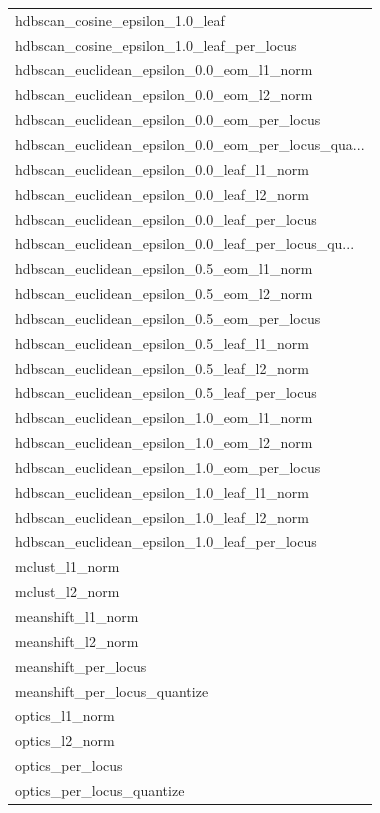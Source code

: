 \begin{longtable}{l}
                   hdbscan\_cosine\_epsilon\_1.0\_leaf \\
         hdbscan\_cosine\_epsilon\_1.0\_leaf\_per\_locus \\
         hdbscan\_euclidean\_epsilon\_0.0\_eom\_l1\_norm \\
         hdbscan\_euclidean\_epsilon\_0.0\_eom\_l2\_norm \\
       hdbscan\_euclidean\_epsilon\_0.0\_eom\_per\_locus \\
hdbscan\_euclidean\_epsilon\_0.0\_eom\_per\_locus\_qua... \\
        hdbscan\_euclidean\_epsilon\_0.0\_leaf\_l1\_norm \\
        hdbscan\_euclidean\_epsilon\_0.0\_leaf\_l2\_norm \\
      hdbscan\_euclidean\_epsilon\_0.0\_leaf\_per\_locus \\
hdbscan\_euclidean\_epsilon\_0.0\_leaf\_per\_locus\_qu... \\
         hdbscan\_euclidean\_epsilon\_0.5\_eom\_l1\_norm \\
         hdbscan\_euclidean\_epsilon\_0.5\_eom\_l2\_norm \\
       hdbscan\_euclidean\_epsilon\_0.5\_eom\_per\_locus \\
        hdbscan\_euclidean\_epsilon\_0.5\_leaf\_l1\_norm \\
        hdbscan\_euclidean\_epsilon\_0.5\_leaf\_l2\_norm \\
      hdbscan\_euclidean\_epsilon\_0.5\_leaf\_per\_locus \\
         hdbscan\_euclidean\_epsilon\_1.0\_eom\_l1\_norm \\
         hdbscan\_euclidean\_epsilon\_1.0\_eom\_l2\_norm \\
       hdbscan\_euclidean\_epsilon\_1.0\_eom\_per\_locus \\
        hdbscan\_euclidean\_epsilon\_1.0\_leaf\_l1\_norm \\
        hdbscan\_euclidean\_epsilon\_1.0\_leaf\_l2\_norm \\
      hdbscan\_euclidean\_epsilon\_1.0\_leaf\_per\_locus \\
                                    mclust\_l1\_norm \\
                                    mclust\_l2\_norm \\
                                 meanshift\_l1\_norm \\
                                 meanshift\_l2\_norm \\
                               meanshift\_per\_locus \\
                      meanshift\_per\_locus\_quantize \\
                                    optics\_l1\_norm \\
                                    optics\_l2\_norm \\
                                  optics\_per\_locus \\
                         optics\_per\_locus\_quantize \\
\end{longtable}

